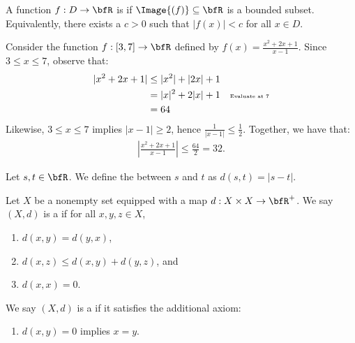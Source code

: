     \begin{definition}
        A function $f:D \rightarrow \bfR$ is  if $\Image{(f)} \subseteq \bfR$ is a bounded subset. Equivalently, there exists a $c >0$ such that $|f(x)| < c$ for all $x \in D$.
    \end{definition}

    \begin{example}
        Consider the function $f:[3,7] \rightarrow \bfR$ defined by $f(x) = \frac{x^2 + 2x + 1}{x-1}$. Since $3 \leq x \leq 7$, observe that:
            \begin{equation*}
            \begin{split}
                |x^2 + 2x + 1| &\leq |x^2| + |2x| + 1 \\
                & = |x|^2 + 2|x| + 1 \quad{\text{\tiny Evaluate at 7}}\\
                & = 64
            \end{split}
            \end{equation*}
        Likewise, $3 \leq x \leq 7$ implies $|x-1| \geq 2$, hence $\frac{1}{|x-1|} \leq \frac{1}{2}$. Together, we have that:
            \begin{equation*}
            \begin{split}
                \left|\frac{x^2+2x+1}{x-1}\right| \leq \frac{64}{2} = 32.
            \end{split}
            \end{equation*}
    \end{example}
    
    \begin{definition}
        Let $s,t \in \bfR$. We define the  between $s$ and $t$ as $d(s,t) = |s-t|$.
    \end{definition}

    \begin{definition}
        Let $X$ be a nonempty set equipped with a map $d:X \times X \rightarrow \bfR^+$. We say $(X,d)$ is a  if for all $x,y,z \in X$,
            \begin{enumerate}[label = (\arabic*)]
                \item $d(x,y) = d(y,x)$,
                \item $d(x,z) \leq d(x,y) + d(y,z)$, and
                \item $d(x,x) = 0$.
            \end{enumerate}
        We say $(X,d)$ is a  if it satisfies the additional axiom:
            \begin{enumerate}[label = (\arabic*)]
                \addtocounter{enumi}{3}
                \item $d(x,y) = 0$ implies $x = y$.
            \end{enumerate}
    \end{definition}

